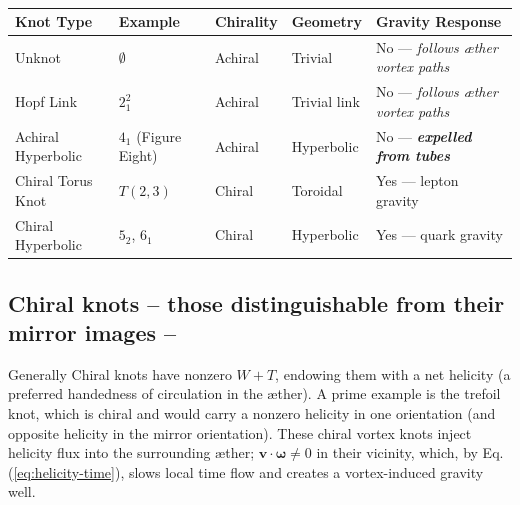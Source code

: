 \documentclass[11pt]{article}
\begin{document}
\begin{table}[H]
    \centering
    \begin{tabular}{lllll}
        \toprule
        \textbf{Knot Type} & \textbf{Example} & \textbf{Chirality} & \textbf{Geometry} & \textbf{Gravity Response} \\
        \midrule
        Unknot & $\emptyset$ & Achiral & Trivial & No — \textit{follows æther vortex paths} \\
        Hopf Link & $2_1^2$ & Achiral & Trivial link & No — \textit{follows æther vortex paths} \\
        Achiral Hyperbolic & $4_1$ (Figure Eight) & Achiral & Hyperbolic & No — \textit{\textbf{expelled from tubes}} \\
        Chiral Torus Knot & $T(2,3)$ & Chiral & Toroidal & Yes — lepton gravity \\
        Chiral Hyperbolic & $5_2$, $6_1$ & Chiral & Hyperbolic & Yes — quark gravity \\
        \bottomrule
    \end{tabular}
    \caption{}
    \label{tab:knot_classification}
\end{table}


\subsection*{Chiral knots -- those distinguishable from their mirror images -- }
Generally Chiral knots have nonzero $W+T$, endowing them with a net helicity (a preferred handedness of circulation in the \ae ther). A prime example is the trefoil knot, which is chiral and would carry a nonzero helicity in one orientation (and opposite helicity in the mirror orientation). These chiral vortex knots inject helicity flux into the surrounding \ae ther; $\mathbf{v}\cdot\boldsymbol{\omega}\neq 0$ in their vicinity, which, by Eq.(\ref{eq:helicity-time}), slows local time flow and creates a vortex-induced gravity well.

\begin{center}
\end{center}
\end{document}
